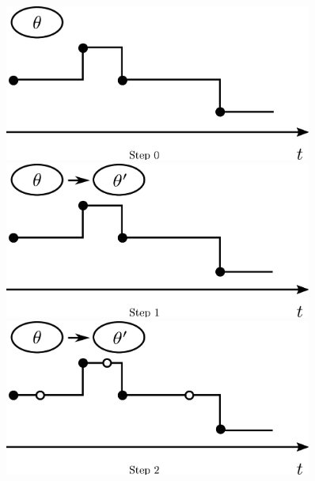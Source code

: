 \setlength{\unitlength}{0.8cm}
  \begin{figure}[h!]
  \centering
  \begin{minipage}[!hp]{0.45\linewidth}
  \centering
    \includegraphics [width=0.90\textwidth, angle=0]{figs/plot0.pdf}
      \end{minipage}
  \begin{minipage}[hp]{0.45\linewidth}
  \centering
    \includegraphics [width=0.90\textwidth, angle=0]{figs/plot1.pdf}
    \vspace{-0 in}
  \end{minipage}
  \begin{minipage}[hp]{0.45\linewidth}
  \centering
    \includegraphics [width=0.90\textwidth, angle=0]{figs/plot2.pdf}
    \vspace{-0 in}

\end{minipage}
\end{figure}
